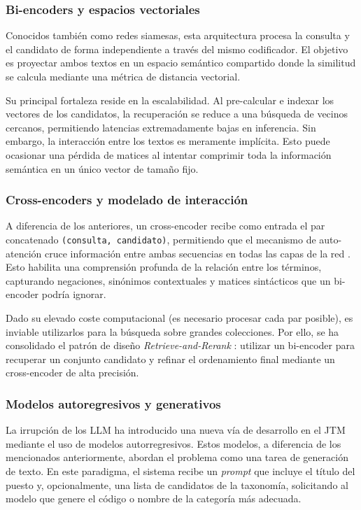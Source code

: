 \subsubsection{Bi-encoders y espacios vectoriales}
\noindent Conocidos también como redes siamesas, esta arquitectura procesa la consulta y el candidato de forma independiente a través del mismo codificador. El objetivo es proyectar ambos textos en un espacio semántico compartido donde la similitud se calcula mediante una métrica de distancia vectorial. 

Su principal fortaleza reside en la escalabilidad. Al pre-calcular e indexar los vectores de los candidatos, la recuperación se reduce a una búsqueda de vecinos cercanos, permitiendo latencias extremadamente bajas en inferencia. Sin embargo, la interacción entre los textos es meramente implícita. Esto puede ocasionar una pérdida de matices al intentar comprimir toda la información semántica en un único vector de tamaño fijo.


\subsubsection{Cross-encoders y modelado de interacción}
\noindent A diferencia de los anteriores, un cross-encoder recibe como entrada el par concatenado \texttt{(consulta, candidato)}, permitiendo que el mecanismo de auto-atención cruce información entre ambas secuencias en todas las capas de la red \cite{reimers2019sentence}. Esto habilita una comprensión profunda de la relación entre los términos, capturando negaciones, sinónimos contextuales y matices sintácticos que un bi-encoder podría ignorar.

Dado su elevado coste computacional (es necesario procesar cada par posible), es inviable utilizarlos para la búsqueda sobre grandes colecciones. Por ello, se ha consolidado el patrón de diseño \textit{Retrieve-and-Rerank} \cite{sbertRetrieveamp,xu2025survey}: utilizar un bi-encoder para recuperar un conjunto candidato y refinar el ordenamiento final mediante un cross-encoder de alta precisión.

\subsubsection{Modelos autoregresivos y generativos}
\noindent La irrupción de los \gls{LLM} ha introducido una nueva vía de desarrollo en el \gls{JTM} mediante el uso de modelos autorregresivos. Estos modelos, a diferencia de los mencionados anteriormente, abordan el problema como una tarea de generación de texto. En este paradigma, el sistema recibe un \textit{prompt} que incluye el título del puesto y, opcionalmente, una lista de candidatos de la taxonomía, solicitando al modelo que genere el código o nombre de la categoría más adecuada.

